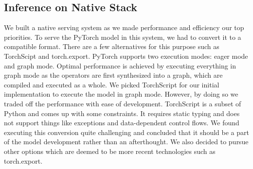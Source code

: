 
\subsection{Inference on Native Stack}
We built a native serving system as we made performance and efficiency our top priorities. To serve the PyTorch model in this system, we had to convert it to a compatible format. There are a few alternatives for this purpose such as TorchScipt and torch.export. PyTorch supports two execution modes: eager mode and graph mode. Optimal performance is achieved by executing everything in graph mode as the operators are first synthesized into a graph, which are compiled and executed as a whole. We picked TorchScript for our initial implementation to execute the model in graph mode. However, by doing so we traded off the performance with ease of development. TorchScript is a subset of Python and comes up with some constraints. It requires static typing and does not support things like exceptions and data-dependent control flows. We found executing this conversion quite challenging and concluded that it should be a part of the model development rather than an afterthought. We also decided to pursue other options which are deemed to be more recent technologies such as torch.export.
